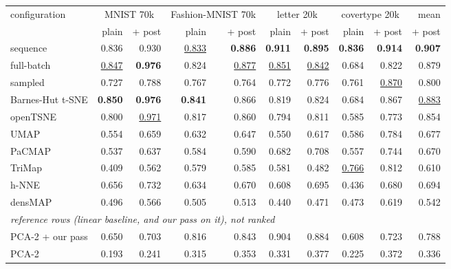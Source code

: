 \begin{tabular}{lrrrrrrrrr}
\toprule
configuration & \multicolumn{2}{c}{MNIST 70k} & \multicolumn{2}{c}{Fashion-MNIST 70k} & \multicolumn{2}{c}{letter 20k} & \multicolumn{2}{c}{covertype 20k} & mean \\
 & plain & + post & plain & + post & plain & + post & plain & + post & + post \\
\midrule
\magnet{} sequence & 0.836 & 0.930 & \underline{0.833} & \textbf{0.886} & \textbf{0.911} & \textbf{0.895} & \textbf{0.836} & \textbf{0.914} & \textbf{0.907} \\
\magnet{} full-batch & \underline{0.847} & \textbf{0.976} & 0.824 & \underline{0.877} & \underline{0.851} & \underline{0.842} & 0.684 & 0.822 & 0.879 \\
\magnet{} sampled & 0.727 & 0.788 & 0.767 & 0.764 & 0.772 & 0.776 & 0.761 & \underline{0.870} & 0.800 \\
Barnes-Hut t-SNE & \textbf{0.850} & \textbf{0.976} & \textbf{0.841} & 0.866 & 0.819 & 0.824 & 0.684 & 0.867 & \underline{0.883} \\
openTSNE & 0.800 & \underline{0.971} & 0.817 & 0.860 & 0.794 & 0.811 & 0.585 & 0.773 & 0.854 \\
UMAP & 0.554 & 0.659 & 0.632 & 0.647 & 0.550 & 0.617 & 0.586 & 0.784 & 0.677 \\
PaCMAP & 0.537 & 0.637 & 0.584 & 0.590 & 0.682 & 0.708 & 0.557 & 0.744 & 0.670 \\
TriMap & 0.409 & 0.562 & 0.579 & 0.585 & 0.581 & 0.482 & \underline{0.766} & 0.812 & 0.610 \\
h-NNE & 0.656 & 0.732 & 0.634 & 0.670 & 0.608 & 0.695 & 0.436 & 0.680 & 0.694 \\
densMAP & 0.496 & 0.566 & 0.505 & 0.513 & 0.440 & 0.471 & 0.473 & 0.619 & 0.542 \\
\midrule
\multicolumn{10}{l}{\emph{reference rows (linear baseline, and our pass on it), not ranked}} \\
PCA-2 + our pass & 0.650 & 0.703 & 0.816 & 0.843 & 0.904 & 0.884 & 0.608 & 0.723 & 0.788 \\
PCA-2 & 0.193 & 0.241 & 0.315 & 0.353 & 0.331 & 0.377 & 0.225 & 0.372 & 0.336 \\
\bottomrule
\end{tabular}
